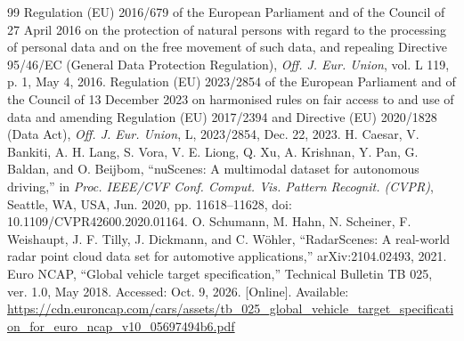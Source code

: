 \begin{thebibliography}{99}
 Regulation (EU) 2016/679 of the European Parliament and of the Council of 27 April 2016 on the protection of natural persons with regard to the processing of personal data and on the free movement of such data, and repealing Directive 95/46/EC (General Data Protection Regulation), \emph{Off. J. Eur. Union}, vol. L 119, p. 1, May 4, 2016.
 Regulation (EU) 2023/2854 of the European Parliament and of the Council of 13 December 2023 on harmonised rules on fair access to and use of data and amending Regulation (EU) 2017/2394 and Directive (EU) 2020/1828 (Data Act), \emph{Off. J. Eur. Union}, L, 2023/2854, Dec. 22, 2023.
 H. Caesar, V. Bankiti, A. H. Lang, S. Vora, V. E. Liong, Q. Xu, A. Krishnan, Y. Pan, G. Baldan, and O. Beijbom, ``nuScenes: A multimodal dataset for autonomous driving,'' in \emph{Proc. IEEE/CVF Conf. Comput. Vis. Pattern Recognit. (CVPR)}, Seattle, WA, USA, Jun. 2020, pp. 11618--11628, doi: 10.1109/CVPR42600.2020.01164.
 O. Schumann, M. Hahn, N. Scheiner, F. Weishaupt, J. F. Tilly, J. Dickmann, and C. W\"{o}hler, ``RadarScenes: A real-world radar point cloud data set for automotive applications,'' arXiv:2104.02493, 2021.
 Euro NCAP, ``Global vehicle target specification,'' Technical Bulletin TB 025, ver. 1.0, May 2018. Accessed: Oct. 9, 2026. [Online]. Available: \url{https://cdn.euroncap.com/cars/assets/tb_025_global_vehicle_target_specification_for_euro_ncap_v10_05697494b6.pdf}
\end{thebibliography}
